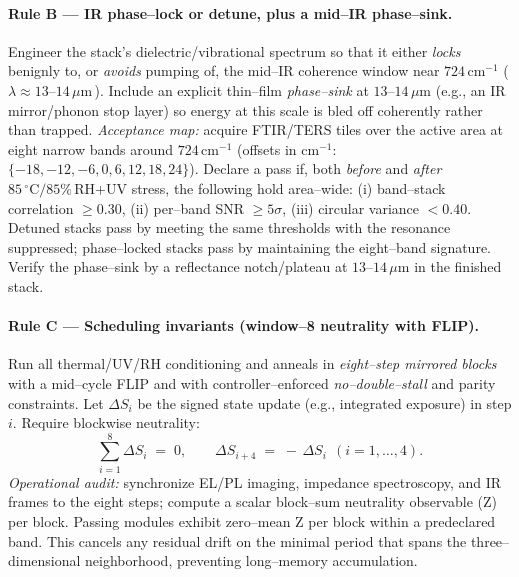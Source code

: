\documentclass[12pt]{article}
\begin{document}
\paragraph{Rule B — IR phase–lock or detune, plus a mid–IR phase–sink.}
Engineer the stack’s dielectric/vibrational spectrum so that it either \emph{locks} benignly to, or \emph{avoids} pumping of, the mid–IR coherence window near $724\,\mathrm{cm}^{-1}$ (\,$\lambda\!\approx\!13$–$14\,\mu\mathrm{m}$\,). Include an explicit thin–film \emph{phase–sink} at $13$–$14\,\mu\mathrm{m}$ (e.g., an IR mirror/phonon stop layer) so energy at this scale is bled off coherently rather than trapped. \emph{Acceptance map:} acquire FTIR/TERS tiles over the active area at eight narrow bands around $724\,\mathrm{cm}^{-1}$ (offsets in $\mathrm{cm}^{-1}$: $\{-18,-12,-6,0,6,12,18,24\}$). Declare a pass if, both \emph{before} and \emph{after} $85\,^{\circ}\mathrm{C}/85\%\,\mathrm{RH}$+UV stress, the following hold area–wide: (i) band–stack correlation $\ge 0.30$, (ii) per–band SNR $\ge 5\sigma$, (iii) circular variance $<0.40$. Detuned stacks pass by meeting the same thresholds with the resonance suppressed; phase–locked stacks pass by maintaining the eight–band signature. Verify the phase–sink by a reflectance notch/plateau at $13$–$14\,\mu\mathrm{m}$ in the finished stack.

\paragraph{Rule C — Scheduling invariants (window–8 neutrality with FLIP).}
Run all thermal/UV/RH conditioning and anneals in \emph{eight–step mirrored blocks} with a mid–cycle FLIP and with controller–enforced \emph{no–double–stall} and parity constraints. Let $\Delta S_i$ be the signed state update (e.g., integrated exposure) in step $i$. Require blockwise neutrality:
\begin{equation}
\sum_{i=1}^{8}\Delta S_i \;=\; 0, 
\qquad 
\Delta S_{i+4} \;=\; -\,\Delta S_i \ \ (i=1,\dots,4).
\end{equation}
\emph{Operational audit:} synchronize EL/PL imaging, impedance spectroscopy, and IR frames to the eight steps; compute a scalar block–sum neutrality observable (Z) per block. Passing modules exhibit zero–mean Z per block within a predeclared band. This cancels any residual drift on the minimal period that spans the three–dimensional neighborhood, preventing long–memory accumulation.
\end{document}
